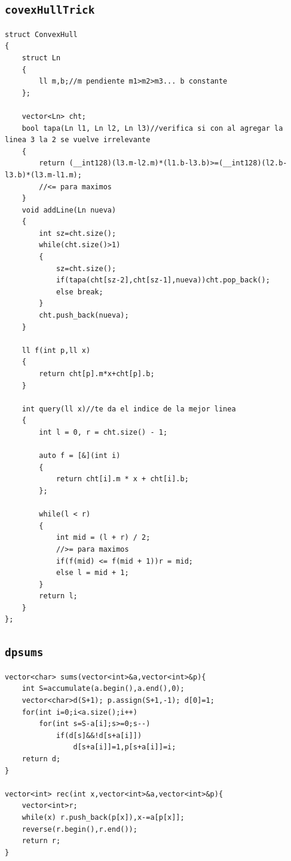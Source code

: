 \subsection{\texttt{covexHullTrick}}
\begin{lstlisting}
struct ConvexHull
{
    struct Ln
    {
        ll m,b;//m pendiente m1>m2>m3... b constante
    };
    
    vector<Ln> cht;
    bool tapa(Ln l1, Ln l2, Ln l3)//verifica si con al agregar la linea 3 la 2 se vuelve irrelevante
    {
        return (__int128)(l3.m-l2.m)*(l1.b-l3.b)>=(__int128)(l2.b-l3.b)*(l3.m-l1.m);
        //<= para maximos
    }
    void addLine(Ln nueva)
    {
        int sz=cht.size();
        while(cht.size()>1)
        {
            sz=cht.size();
            if(tapa(cht[sz-2],cht[sz-1],nueva))cht.pop_back();
            else break;
        }
        cht.push_back(nueva);
    }

    ll f(int p,ll x)
    {
        return cht[p].m*x+cht[p].b;
    }

    int query(ll x)//te da el indice de la mejor linea
    {
        int l = 0, r = cht.size() - 1;

        auto f = [&](int i)
        {
            return cht[i].m * x + cht[i].b;
        };

        while(l < r)
        {
            int mid = (l + r) / 2;
            //>= para maximos
            if(f(mid) <= f(mid + 1))r = mid;
            else l = mid + 1;
        }
        return l;
    }
};
\end{lstlisting}

\subsection{\texttt{dpsums}}
\begin{lstlisting}
vector<char> sums(vector<int>&a,vector<int>&p){
    int S=accumulate(a.begin(),a.end(),0);
    vector<char>d(S+1); p.assign(S+1,-1); d[0]=1;
    for(int i=0;i<a.size();i++)
        for(int s=S-a[i];s>=0;s--)
            if(d[s]&&!d[s+a[i]])
                d[s+a[i]]=1,p[s+a[i]]=i;
    return d;
}

vector<int> rec(int x,vector<int>&a,vector<int>&p){
    vector<int>r;
    while(x) r.push_back(p[x]),x-=a[p[x]];
    reverse(r.begin(),r.end());
    return r;
}\end{lstlisting}

